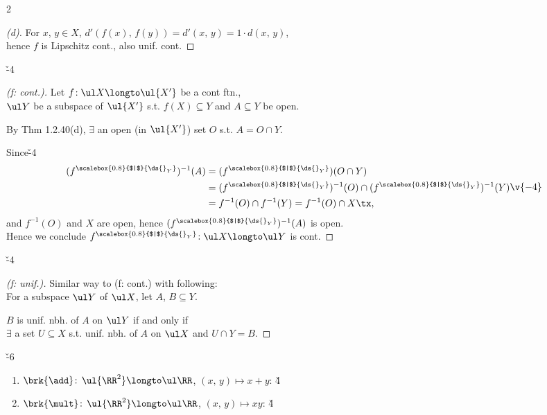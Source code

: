 \documentclass[dvipdfmx,a4paper,titlepage,9pt]{jsarticle}
\begin{document}
\begin{multicols*}{2}
\begin{pfbox}[\!\!: (c), (d), (f)]
\dotfill

\begin{proof}[(d)] For $x$, $y\in X$, $d'(f(x),\,f(y))=d'(x,\,y)=1\cdot d(x,\,y)$,\\
hence $f$ is Lipschitz cont., also unif. cont.
\end{proof}\v{-4}

\dotfill

\begin{proof}[(f: cont.)] Let $f\!:\ul X\longto\ul{X'}$ be a cont ftn.,\\
$\ul Y$ be a subspace of $\ul{X'}$ s.t. $f(X)\subseteq Y$ and $A\subseteq Y$ be open.

By Thm 1.2.40(d), $\exists$ an open (in $\ul{X'}$) set $O$ s.t. $A=O\cap Y$.

Since\v{-4}
$$\begin{aligned}
(f^{\scalebox{0.8}{$|$}{\ds{}_Y}})^{-1}(A)&=(f^{\scalebox{0.8}{$|$}{\ds{}_Y}})(O\cap Y)\\
&=(f^{\scalebox{0.8}{$|$}{\ds{}_Y}})^{-1}(O)\cap(f^{\scalebox{0.8}{$|$}{\ds{}_Y}})^{-1}(Y)\\
&=f^{-1}(O)\cap f^{-1}(Y)=f^{-1}(O)\cap X\tx,\end{aligned}\v{-4}$$
and $f^{-1}(O)$ and $X$ are open, hence $(f^{\scalebox{0.8}{$|$}{\ds{}_Y}})^{-1}(A)$ is open.\\
Hence we conclude $f^{\scalebox{0.8}{$|$}{\ds{}_Y}}\!:\ul X\longto\ul Y$ is cont.
\end{proof}\v{-4}

\dotfill

\begin{proof}[(f: unif.)] Similar way to (f: cont.) with following:\\
For a subspace $\ul Y$ of $\ul X$, let $A$, $B\subseteq Y$.

$B$ is unif. nbh. of $A$ on $\ul Y$ if and only if\\
$\exists$ a set $U\subseteq X$ s.t. unif. nbh. of $A$ on $\ul X$ and $U\cap Y=B$.
\end{proof}
\end{pfbox}

\newpage

\v{-6}
\begin{enumerate}[label=(\alph*)]
\item$\brk{\add}\!:\,\ul{\RR^2}\longto\ul\RR$, $(x,\,y)\longmapsto x+y$: \v4

\item$\brk{\mult}\!:\,\ul{\RR^2}\longto\ul\RR$, $(x,\,y)\longmapsto xy$: \v4


\end{enumerate}
\end{multicols*}
\end{document}
